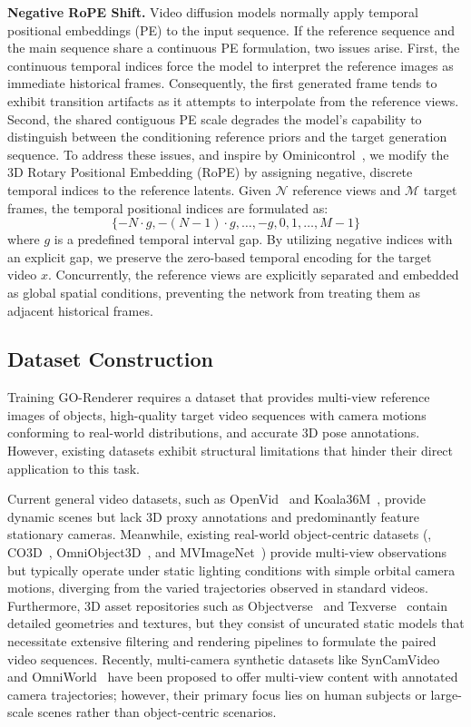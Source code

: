 \documentclass[runningheads]{llncs}
\newcommand{\methodname}{GO-Renderer\xspace}
\begin{document}
\textbf{Negative RoPE Shift.} 
Video diffusion models normally apply temporal positional embeddings (PE) to the input sequence. If the reference sequence and the main sequence share a continuous PE formulation, two issues arise. First, the continuous temporal indices force the model to interpret the reference images as immediate historical frames. Consequently, the first generated frame tends to exhibit transition artifacts as it attempts to interpolate from the reference views. Second, the shared contiguous PE scale degrades the model's capability to distinguish between the conditioning reference priors and the target generation sequence. 
To address these issues, and inspire by Ominicontrol~\cite{ominicontrol,storymem}, we modify the 3D Rotary Positional Embedding (RoPE) by assigning negative, discrete temporal indices to the reference latents. Given $\mathcal{N}$ reference views and $\mathcal{M}$ target frames, the temporal positional indices are formulated as: 
\begin{equation}
    \{-N \cdot g, -(N-1) \cdot g, \dots, -g, 0, 1, \dots, M-1\}
\end{equation}
where $g$ is a predefined temporal interval gap. By utilizing negative indices with an explicit gap, we preserve the zero-based temporal encoding for the target video $x$. Concurrently, the reference views are explicitly separated and embedded as global spatial conditions, preventing the network from treating them as adjacent historical frames. 

\subsection{Dataset Construction}
\label{sec:dataset}

Training \methodname requires a dataset that provides multi-view reference images of objects, high-quality target video sequences with camera motions conforming to real-world distributions, and accurate 3D pose annotations. However, existing datasets exhibit structural limitations that hinder their direct application to this task. 

Current general video datasets, such as OpenVid~\cite{openvid} and Koala36M~\cite{koala36m}, provide dynamic scenes but lack 3D proxy annotations and predominantly feature stationary cameras. Meanwhile, existing real-world object-centric datasets (\eg, CO3D~\cite{co3d}, OmniObject3D~\cite{omniobject3d}, and MVImageNet~\cite{mvimagenet}) provide multi-view observations but typically operate under static lighting conditions with simple orbital camera motions, diverging from the varied trajectories observed in standard videos. Furthermore, 3D asset repositories such as Objectverse~\cite{objectverse} and Texverse~\cite{texverse} contain detailed geometries and textures, but they consist of uncurated static models that necessitate extensive filtering and rendering pipelines to formulate the paired video sequences. Recently, multi-camera synthetic datasets like SynCamVideo~\cite{syncammaster} and OmniWorld~\cite{omniworld} have been proposed to offer multi-view content with annotated camera trajectories; however, their primary focus lies on human subjects or large-scale scenes rather than object-centric scenarios.
\end{document}
